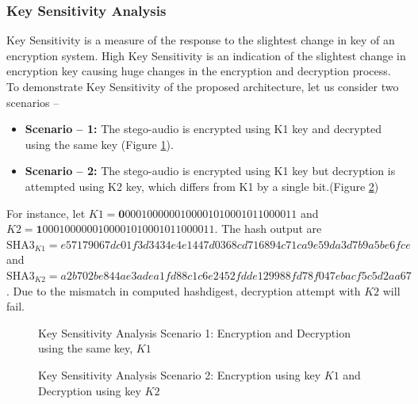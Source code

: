 \documentclass[a4paper]{cas-sc}
\begin{document}
\subsubsection{Key Sensitivity Analysis}
Key Sensitivity is a measure of the response to the slightest change in key of an encryption system. High Key Sensitivity is an indication of the slightest change in encryption key causing huge changes in the encryption and decryption process. To demonstrate Key Sensitivity of the proposed architecture, let us consider two scenarios --
\begin{itemize}
    \item \textbf{Scenario -- 1:} The stego-audio is encrypted using K1 key and decrypted using the same key (Figure \ref{fig:keySensitivityK1}).
    \item \textbf{Scenario -- 2:} The stego-audio is encrypted using K1 key but decryption is attempted using K2 key, which differs from K1 by a single bit.(Figure \ref{fig:keySensitivityK2})
\end{itemize}
For instance, let $K1=\mathbf{0}0001000000100001010001011000011$ and $K2=\mathbf{1}0001000000100001010001011000011$. The hash output are $\text{SHA3}_{K1}=e57179067dc01f3d3434e4e1447d0368cd716894c71ca9e59da3d7b9a5be6fce$ and $\text{SHA3}_{K2}=a2b702be844ae3adea1fd88c1c6e2452fdde129988fd78f047ebacf5c5d2aa67$. Due to the mismatch in computed hashdigest, decryption attempt with $K2$ will fail.
\begin{figure}[pos=h]
    \begin{center}
        
        \caption{Key Sensitivity Analysis Scenario 1: Encryption and Decryption using the same key, $K1$}
        \label{fig:keySensitivityK1}
    \end{center}
\end{figure}
\begin{figure}[pos=h]
    \begin{center}
        
        \caption{Key Sensitivity Analysis Scenario 2: Encryption using key $K1$ and Decryption using key $K2$}
        \label{fig:keySensitivityK2}
    \end{center}
\end{figure}
\end{document}
